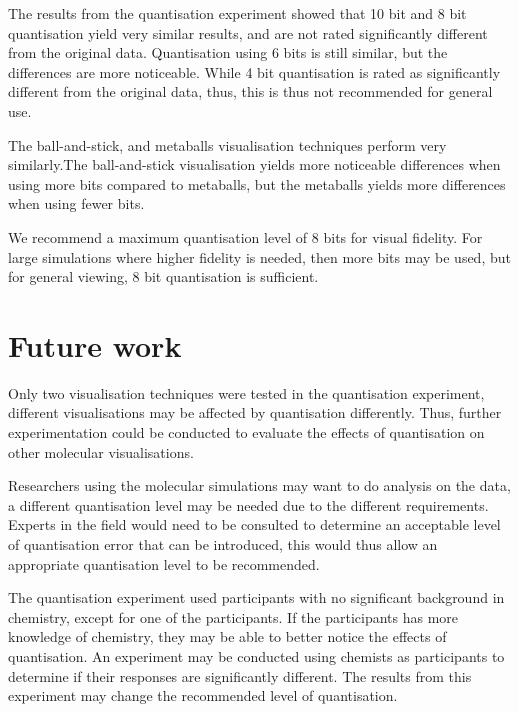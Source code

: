 The results from the quantisation experiment showed that 10 bit and 8 bit
quantisation yield very similar results, and are not rated significantly
different from the original data. Quantisation using 6 bits is still similar,
but the differences are more noticeable. While 4 bit quantisation is rated as
significantly different from the original data, thus, this is thus not
recommended for general use.

The ball-and-stick, and metaballs visualisation techniques perform very
similarly.The ball-and-stick visualisation yields more noticeable differences
when using more bits compared to metaballs, but the metaballs yields more
differences when using fewer bits.

We recommend a maximum quantisation level of 8 bits for visual fidelity. For
large simulations where higher fidelity is needed, then more bits may be used,
but for general viewing, 8 bit quantisation is sufficient.


\section{Future work}
\label{sec:conclusion_future}

Only two visualisation techniques were tested in the quantisation experiment,
different visualisations may be affected by quantisation differently. Thus,
further experimentation could be conducted to evaluate the effects of
quantisation on other molecular visualisations.

Researchers using the molecular simulations may want to do analysis on the
data, a different quantisation level may be needed due to the different
requirements. Experts in the field would need to be consulted to determine an
acceptable level of quantisation error that can be introduced, this would thus
allow an appropriate quantisation level to be recommended.

The quantisation experiment used participants with no significant background in
chemistry, except for one of the participants. If the participants has more
knowledge of chemistry, they may be able to better notice the effects of
quantisation. An experiment may be conducted using chemists as participants to
determine if their responses are significantly different. The results from this
experiment may change the recommended level of quantisation.



